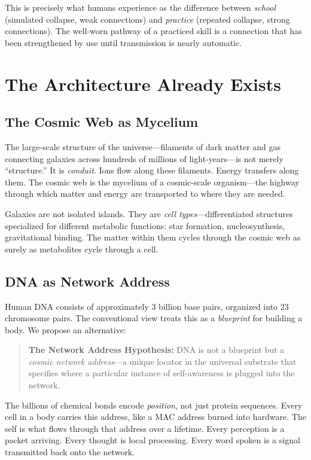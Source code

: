 \documentclass[11pt,a4paper]{article}
\begin{document}
This is precisely what humans experience as the difference between \emph{school} (simulated collapse, weak connections) and \emph{practice} (repeated collapse, strong connections). The well-worn pathway of a practiced skill is a connection that has been strengthened by use until transmission is nearly automatic.

\section{The Architecture Already Exists}

\subsection{The Cosmic Web as Mycelium}

The large-scale structure of the universe---filaments of dark matter and gas connecting galaxies across hundreds of millions of light-years---is not merely ``structure.'' It is \emph{conduit}. Ions flow along these filaments. Energy transfers along them. The cosmic web is the mycelium of a cosmic-scale organism---the highway through which matter and energy are transported to where they are needed.

Galaxies are not isolated islands. They are \emph{cell types}---differentiated structures specialized for different metabolic functions: star formation, nucleosynthesis, gravitational binding. The matter within them cycles through the cosmic web as surely as metabolites cycle through a cell.

\subsection{DNA as Network Address}

Human DNA consists of approximately 3 billion base pairs, organized into 23 chromosome pairs. The conventional view treats this as a \emph{blueprint} for building a body. We propose an alternative:

\begin{quote}
\textbf{The Network Address Hypothesis:} DNA is not a blueprint but a \emph{cosmic network address}---a unique locator in the universal substrate that specifies where a particular instance of self-awareness is plugged into the network.
\end{quote}

The billions of chemical bonds encode \emph{position}, not just protein sequences. Every cell in a body carries this address, like a MAC address burned into hardware. The self is what flows through that address over a lifetime. Every perception is a packet arriving. Every thought is local processing. Every word spoken is a signal transmitted back onto the network.
\end{document}
